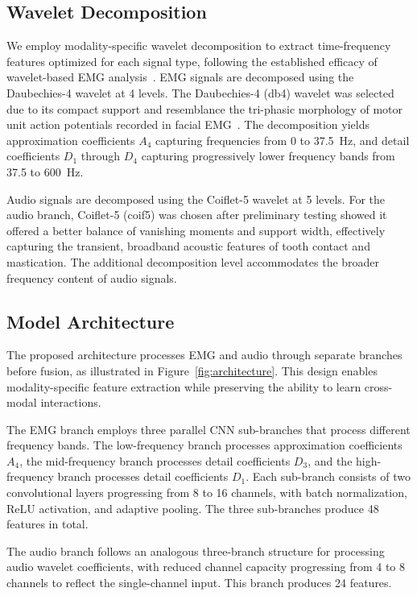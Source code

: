 \documentclass[acmtog, nonacm]{acmart}
\begin{document}
\subsection{Wavelet Decomposition}

We employ modality-specific wavelet decomposition to extract time-frequency features optimized for each signal type, following the established efficacy of wavelet-based EMG analysis~\cite{phinyomark2012feature}. EMG signals are decomposed using the Daubechies-4 wavelet at 4 levels. 
The Daubechies-4 (db4) wavelet was selected due to its compact support and resemblance the tri-phasic morphology of motor unit action potentials recorded in facial EMG~\cite{englehart2003robust}. The decomposition yields approximation coefficients $A_4$ capturing frequencies from 0 to 37.5~Hz, and detail coefficients $D_1$ through $D_4$ capturing progressively lower frequency bands from 37.5 to 600~Hz.

Audio signals are decomposed using the Coiflet-5 wavelet at 5 levels. For the audio branch, Coiflet-5 (coif5) was chosen after preliminary testing showed it offered a better balance of vanishing moments and support width, effectively capturing the transient, broadband acoustic features of tooth contact and mastication. The additional decomposition level accommodates the broader frequency content of audio signals. \cite{bharathi2025unveiling}

\subsection{Model Architecture}

The proposed architecture processes EMG and audio through separate branches before fusion, as illustrated in Figure~\ref{fig:architecture}. This design enables modality-specific feature extraction while preserving the ability to learn cross-modal interactions.

The EMG branch employs three parallel CNN sub-branches that process different frequency bands. The low-frequency branch processes approximation coefficients $A_4$, the mid-frequency branch processes detail coefficients $D_3$, and the high-frequency branch processes detail coefficients $D_1$. Each sub-branch consists of two convolutional layers progressing from 8 to 16 channels, with batch normalization, ReLU activation, and adaptive pooling. The three sub-branches produce 48 features in total.

The audio branch follows an analogous three-branch structure for processing audio wavelet coefficients, with reduced channel capacity progressing from 4 to 8 channels to reflect the single-channel input. This branch produces 24 features.
\end{document}

